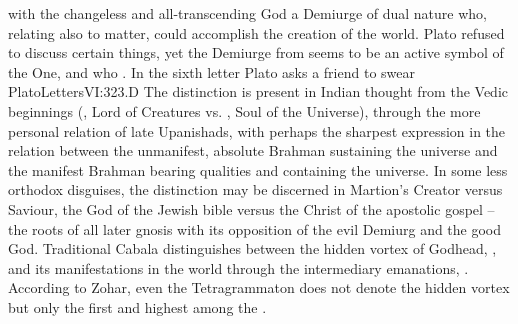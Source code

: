 with the changeless and all-transcending God a Demiurge of dual nature who,
relating also to matter, could accomplish the creation of the world.  Plato
refused to discuss certain things, yet the Demiurge from  seems to
be an active symbol of the One,  and who . In the sixth letter Plato asks a friend
to swear \citet{in the name of the God who is captain of all things present and
  to come, and of the Father of that captain and cause.}{PlatoLetters}{VI:323.D}
 The distinction is present in Indian thought
from the Vedic beginnings (, Lord of Creatures vs. ,
Soul of the Universe), through the more personal relation of late
Upanishads, with perhaps
the sharpest expression in the relation between the unmanifest, absolute Brahman
sustaining the universe and the manifest Brahman bearing qualities and
containing the universe.  In some less orthodox disguises, the distinction may
be discerned in Martion's Creator versus Saviour, the God of the Jewish bible
versus the Christ of the apostolic gospel -- the roots of all later gnosis with
its opposition of the evil Demiurg and the good
God. Traditional Cabala
distinguishes between the hidden vortex of Godhead, , and its
manifestations in the world through the intermediary emanations, .
According to Zohar, even the Tetragrammaton  does not denote the
hidden vortex but only the first and highest among the 
.
%
%



